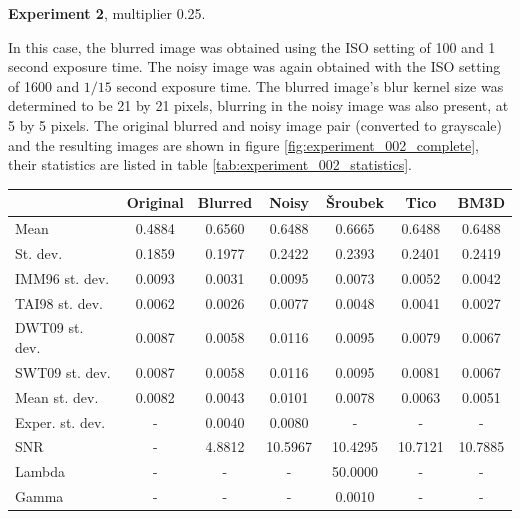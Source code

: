 \documentclass[12pt,notitlepage]{report}
\begin{document}
\clearpage

\noindent \textbf{Experiment 2}, multiplier 0.25.

In this case, the blurred image was obtained using the ISO setting of 100 and 1 second exposure time. The noisy image was again obtained with the ISO setting of 1600 and $1/15$ second exposure time. The blurred image's blur kernel size was determined to be 21 by 21 pixels, blurring in the noisy image was also present, at 5 by 5 pixels. The original blurred and noisy image pair (converted to grayscale) and the resulting images are shown in figure \ref{fig:experiment_002_complete}, their statistics are listed in table \ref{tab:experiment_002_statistics}.

\begin{table}[htb]
  \centering
  \begin{tabular}{ | l | c | c | c | c | c | c | }
    \hline
		           & Original & Blurred & Noisy   & Šroubek & Tico    & BM3D    \\ \hline
	Mean           & 0.4884   & 0.6560  & 0.6488  & 0.6665  & 0.6488  & 0.6488  \\ \hline
	St. dev.       & 0.1859   & 0.1977  & 0.2422  & 0.2393  & 0.2401  & 0.2419  \\ \hline
	IMM96 st. dev. & 0.0093   & 0.0031  & 0.0095  & 0.0073  & 0.0052  & 0.0042  \\ \hline
	TAI98 st. dev. & 0.0062   & 0.0026  & 0.0077  & 0.0048  & 0.0041  & 0.0027  \\ \hline
	DWT09 st. dev. & 0.0087   & 0.0058  & 0.0116  & 0.0095  & 0.0079  & 0.0067  \\ \hline
	SWT09 st. dev. & 0.0087   & 0.0058  & 0.0116  & 0.0095  & 0.0081  & 0.0067  \\ \hline
	Mean st. dev.  & 0.0082   & 0.0043  & 0.0101  & 0.0078  & 0.0063  & 0.0051  \\ \hline
	Exper. st. dev.& -        & 0.0040  & 0.0080  & -       & -       & -       \\ \hline
	SNR            & -        & 4.8812  & 10.5967 & 10.4295 & 10.7121 & 10.7885 \\ \hline
	Lambda         & -        & -       & -       & 50.0000 & -       & -       \\ \hline
	Gamma          & -        & -       & -       & 0.0010  & -       & -       \\ \hline


\end{tabular}
\end{table}
\end{document}
